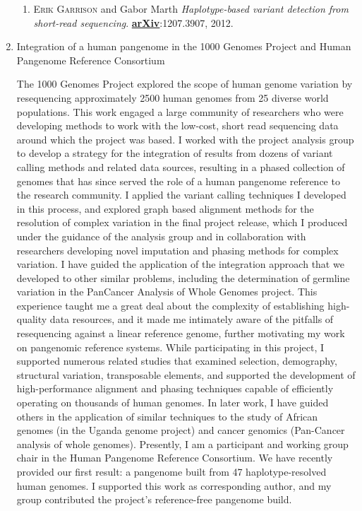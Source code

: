 \documentclass{nihbiosketch}
\newcommand{\hijournal}[1]{{\bf {\uline{#1}}}}
\begin{document}
\begin{enumerate}
\begin{enumerate}
  \item \textsc{Erik Garrison} and Gabor Marth \emph{Haplotype-based variant detection from short-read sequencing}. \hijournal{arXiv}:1207.3907, 2012.

  \end{enumerate}


\item Integration of a human pangenome in the 1000 Genomes Project and Human Pangenome Reference Consortium

  The 1000 Genomes Project explored the scope of human genome variation by resequencing approximately 2500 human genomes from 25 diverse world populations. This work engaged a large community of researchers who were developing methods to work with the low-cost, short read sequencing data around which the project was based. I worked with the project analysis group to develop a strategy for the integration of results from dozens of variant calling methods and related data sources, resulting in a phased collection of genomes that has since served the role of a human pangenome reference to the research community. I applied the variant calling techniques I developed in this process, and explored graph based alignment methods for the resolution of complex variation in the final project release, which I produced under the guidance of the analysis group and in collaboration with researchers developing novel imputation and phasing methods for complex variation. I have guided the application of the integration approach that we developed to other similar problems, including the determination of germline variation in the PanCancer Analysis of Whole Genomes project. This experience taught me a great deal about the complexity of establishing high-quality data resources, and it made me intimately aware of the pitfalls of resequencing against a linear reference genome, further motivating my work on pangenomic reference systems. While participating in this project, I supported numerous related studies that examined selection, demography, structural variation, transposable elements, and supported the development of high-performance alignment and phasing techniques capable of efficiently operating on thousands of human genomes. In later work, I have guided others in the application of similar techniques to the study of African genomes (in the Uganda genome project) and cancer genomics (Pan-Cancer analysis of whole genomes). Presently, I am a participant and working group chair in the Human Pangenome Reference Consortium. We have recently provided our first result: a pangenome built from 47 haplotype-resolved human genomes. I supported this work as corresponding author, and my group contributed the project's reference-free pangenome build.


\end{enumerate}
\end{document}
